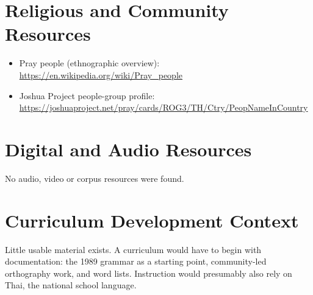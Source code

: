 \documentclass[12pt]{article}
\begin{document}
\section{Religious and Community Resources}
\begin{itemize}
\item Pray people (ethnographic overview): \url{https://en.wikipedia.org/wiki/Pray_people}
\item Joshua Project people-group profile: \url{https://joshuaproject.net/pray/cards/ROG3/TH/Ctry/PeopNameInCountry}
\end{itemize}

\section{Digital and Audio Resources}
No audio, video or corpus resources were found.

\section{Curriculum Development Context}
Little usable material exists. A curriculum would have to begin with documentation: the 1989 grammar as a starting point, community-led orthography work, and word lists. Instruction would presumably also rely on Thai, the national school language.
\end{document}
